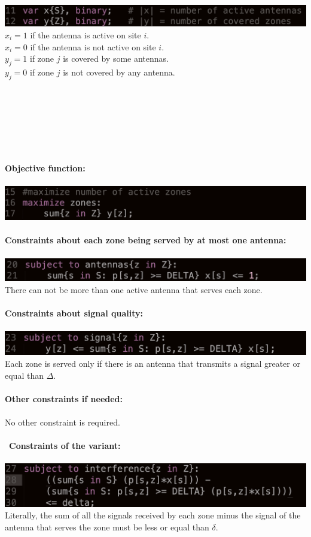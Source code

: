 \documentclass[1pt]{article}
\begin{document}
\includegraphics[scale=0.25]{images/variables}
$x_i = 1$ if the antenna is active on site $i$.\\
$x_i = 0$ if the antenna is not active on site $i$.\\
$y_j = 1$ if zone $j$ is covered by some antennas.\\
$y_j = 0$ if zone $j$ is not covered by any antenna.\\
\\\\\\\\\\\\\\
\textbf{Objective function:}\\\\
\includegraphics[scale=0.25]{images/function}
\\\\
\textbf{Constraints about each zone being served by at most one antenna:}\\\\
\includegraphics[scale=0.25]{images/one_antenna}\\
There can not be more than one active antenna that serves each zone.\\\\
\textbf{Constraints about signal quality:}\\\\
\includegraphics[scale=0.25]{images/signal}\\
Each zone is served only if there is an antenna that transmits a signal greater or equal than $\Delta$.\\\\
\textbf{Other constraints if needed:}\\\\
No other constraint is required.\\\\\
\textbf{Constraints of the variant:}\\\\
\includegraphics[scale=0.25]{images/variant}\\
Literally, the sum of all the signals received by each zone minus the signal of the antenna that serves the zone must be less or equal than $\delta$.\\\\
\end{document}
